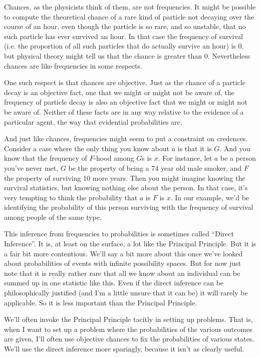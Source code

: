 Chances, as the physicists think of them, are not frequencies. It might be possible to compute the theoretical chance of a rare kind of particle not decaying over the course of an hour, even though the particle is so rare, and so unstable, that no such particle has ever survived an hour. In that case the frequency of survival (i.e. the proportion of all such particles that do actually survive an hour) is 0, but physical theory might tell us that the chance is greater than 0. Nevertheless chances are like frequencies in some respects.

One such respect is that chances are objective. Just as the chance of a particle decay is an objective fact, one that we might or might not be aware of, the frequency of particle decay is also an objective fact that we might or might not be aware of. Neither of these facts are in any way relative to the evidence of a particular agent, the way that evidential probabilities are.

And just like chances, frequencies might seem to put a constraint on credences. Consider a case where the only thing you know about $a$ is that it is $G$. And you know that the frequency of $F$-hood among $G$s is $x$. For instance, let $a$ be a person you've never met, $G$ be the property of being a 74 year old male smoker, and $F$ the property of surviving 10 more years. Then you might imagine knowing the survival statistics, but knowing nothing else about the person. In that case, it's very tempting to think the probability that $a$ is $F$ is $x$. In our example, we'd be identifying the probability of this person surviving with the frequency of survival among people of the same type.

This inference from frequencies to probabilities is sometimes called ``Direct Inference''. It is, at least on the surface, a lot like the Principal Principle. But it is a fair bit more contentious. We'll say a bit more about this once we've looked about probabilities of events with infinite possibility spaces. But for now just note that it is really rather rare that all we know about an individual can be summed up in one statistic like this. Even if the direct inference can be philosophically justified (and I'm a little unsure that it can be) it will rarely be applicable. So it is less important than the Principal Principle.

We'll often invoke the Principal Principle tacitly in setting up problems. That is, when I want to set up a problem where the probabilities of the various outcomes are given, I'll often use objective chances to fix the probabilities of various states. We'll use the direct inference more sparingly, because it isn't as clearly useful.